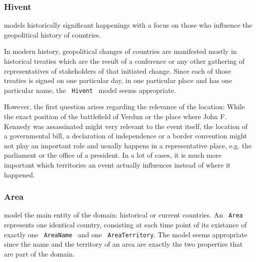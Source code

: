 \subsubsection{Hivent} %
\label{ssub:hivent}

models historically significant happenings with a focus on those who influence the geopolitical history of countries.

In modern history, geopolitical changes of countries are manifested mostly in historical treaties which are the result of a conference or any other gathering of representatives of stakeholders of that initiated change. Since each of those treaties is signed on one particular day, in one particular place and has one particular name, the ~\texttt{Hivent}~ model seems appropriate.

However, the first question arises regarding the relevance of the location: While the exact position of the battlefield of Verdun or the place where John F. Kennedy was assassinated might very relevant to the event itself, the location of a governmental bill, a declaration of independence or a border convention might not play an important role and usually happens in a representative place, e.g. the parliament or the office of a president. In a lot of cases, it is much more important which territories an event actually influences instead of where it happened.


\subsubsection{Area} %
\label{ssub:area}

model the main entity of the domain: historical or current countries. An ~\texttt{Area}~ represents one identical country, consisting at each time point of its existance of exactly one ~\texttt{AreaName}~ and one ~\texttt{AreaTerritory}. The model seems appropriate since the name and the territory of an area are exactly the two properties that are part of the domain.








